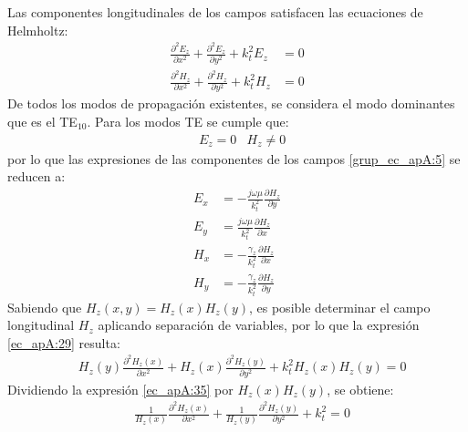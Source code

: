 Las componentes longitudinales de los campos satisfacen las ecuaciones de Helmholtz:
\begin{subequations}
\label{grup_ec_apA:6}
\begin{align}
\frac{\partial ^2E_z}{\partial x^2} + \frac{\partial ^2E_z}{\partial y^2} + k^2_tE_z &= 0
\label{ec_apA:28}\\
\frac{\partial ^2H_z}{\partial x^2} + \frac{\partial ^2H_z}{\partial y^2} + k^2_tH_z &= 0
\label{ec_apA:29}
\end{align}
\end{subequations}
De todos los modos de propagación existentes, se considera el modo dominantes que es el TE$_{10}$. Para los modos TE se cumple que:
\begin{align}
&E_z= 0 &H_z \not= 0
\label{ec_apA:30}
\end{align}
por lo que las expresiones de las componentes de los campos \eqref{grup_ec_apA:5} se reducen a:
\begin{subequations}
\label{grup_ec_apA:7}
\begin{align}
E_x &= - \frac{j\omega\mu}{k^2_t}\frac{\partial H_z}{\partial y}
\label{ec_apA:31}\\
E_y &= \frac{j\omega\mu}{k^2_t}\frac{\partial H_z}{\partial x}
\label{ec_apA:32}\\
H_x &= - \frac{\gamma_z}{k^2_t}\frac{\partial H_z}{\partial x}
\label{ec_apA:33}\\
H_y &= - \frac{\gamma_z}{k^2_t}\frac{\partial H_z}{\partial y}
\label{ec_apA:34}
\end{align}
\end{subequations}
Sabiendo que $H_z\left(x,y\right) = H_z\left(x\right)H_z\left(y\right)$, es posible determinar el campo longitudinal $H_z$ aplicando separación de variables, por lo que la expresión \eqref{ec_apA:29} resulta:
\begin{align}
&H_z\left(y\right)\frac{\partial^2H_z\left(x\right)}{\partial x^2} + H_z\left(x\right)\frac{\partial^2H_z\left(y\right)}{\partial y^2} + k_t^2H_z\left(x\right)H_z\left(y\right) = 0
\label{ec_apA:35}
\end{align}
Dividiendo la expresión \eqref{ec_apA:35} por $H_z\left(x\right)H_z\left(y\right)$, se obtiene:
\begin{align}
&\frac{1}{H_z\left(x\right)}\frac{\partial^2H_z\left(x\right)}{\partial x^2} + \frac{1}{H_z\left(y\right)}\frac{\partial^2H_z\left(y\right)}{\partial y^2} + k_t^2 = 0
\label{ec_apA:36}
\end{align}
